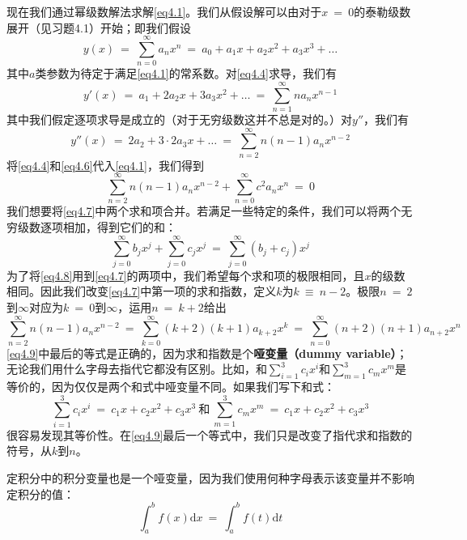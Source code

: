 \documentclass[12pt,a4paper,openany]{ctexbook}
\newcommand{\dd}[1]{\mathrm{d} #1}
\begin{document}
\begin{flushleft}
现在我们通过幂级数解法求解\eqref{eq4.1}。我们从假设解可以由对于$x\ =\ 0$的泰勒级数展开（见习题4.1）开始；即我们假设
\begin{equation}
    y(x)\ =\ \sum_{n=0}^\infty a_nx^n\ =\ a_0+a_1x+a_2x^2+a_3x^3+\dots \label{eq4.4}
\end{equation}
其中$a$类参数为待定于满足\eqref{eq4.1}的常系数。对\eqref{eq4.4}求导，我们有
\begin{equation}
    y'(x)\ =\ a_1+2a_2x+3a_3x^2+\dots\ =\ \sum_{n=1}^\infty na_nx^{n-1} \label{eq4.5}
\end{equation}
其中我们假定逐项求导是成立的（对于无穷级数这并不总是对的。）对$y''$，我们有
\begin{equation}
    y''(x)\ =\ 2a_2+3\cdot 2a_3x+\dots\ =\ \sum_{n=2}^\infty n(n-1)a_nx^{n-2} \label{eq4.6}
\end{equation}
将\eqref{eq4.4}和\eqref{eq4.6}代入\eqref{eq4.1}，我们得到
\begin{equation}
    \sum_{n=2}^\infty n(n-1)a_nx^{n-2}+\sum_{n=0}^\infty c^2a_nx^n\ =\ 0 \label{eq4.7}
\end{equation}
我们想要将\eqref{eq4.7}中两个求和项合并。若满足一些特定的条件，我们可以将两个无穷级数逐项相加，得到它们的和：
\begin{equation}
    \sum_{j=0}^\infty b_jx^j+\sum_{j=0}^\infty c_jx^j\ =\ \sum_{j=0}^\infty (b_j+c_j)x^j \label{eq4.8}
\end{equation}
为了将\eqref{eq4.8}用到\eqref{eq4.7}的两项中，我们希望每个求和项的极限相同，且$x$的级数相同。因此我们改变\eqref{eq4.7}中第一项的求和指数，定义$k$为$k\ \equiv\ n-2$。极限$n\ =\ 2$到$\infty$对应为$k\ =\ 0$到$\infty$，运用$n\ =\ k+2$给出
\begin{equation}
    \sum_{n=2}^\infty n(n-1)a_nx^{n-2}\ =\ \sum_{k=0}^\infty (k+2)(k+1)a_{k+2}x^k\ =\ \sum_{n=0}^\infty (n+2)(n+1)a_{n+2}x^n \label{eq4.9}
\end{equation}
\eqref{eq4.9}中最后的等式是正确的，因为求和指数是个\textbf{哑变量（dummy variable）}；无论我们用什么字母去指代它都没有区别。比如，和$\sum_{i=1}^3c_ix^i$和$\sum_{m=1}^3c_mx^m$是等价的，因为仅仅是两个和式中哑变量不同。如果我们写下和式：
\begin{equation*}
    \sum_{i=1}^3c_ix^i\ =\ c_1x+c_2x^2+c_3x^3\ \text{和}\ \sum_{m=1}^3c_mx^m\ =\ c_1x+c_2x^2+c_3x^3
\end{equation*}
很容易发现其等价性。在\eqref{eq4.9}最后一个等式中，我们只是改变了指代求和指数的符号，从$k$到$n$。

定积分中的积分变量也是一个哑变量，因为我们使用何种字母表示该变量并不影响定积分的值：
\begin{equation}
    \int_a^bf(x)\dd x\ =\ \int_a^bf(t)\dd t \label{eq4.10}
\end{equation}


\end{flushleft}
\end{document}
